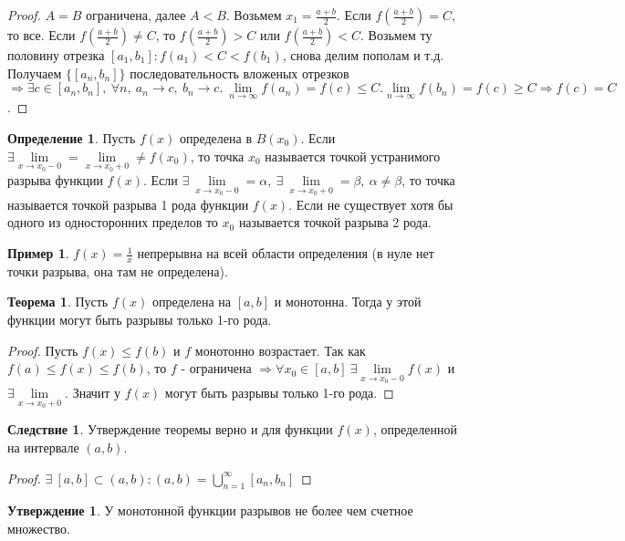 \documentclass[a4paper, 12pt]{article}
\newcommand{\lims}{\lim\limits_{n\to \infty}}
\theoremstyle{definition}
\newtheorem*{definition}{Определение}
\newtheorem*{theorem}{Теорема}
\newtheorem*{consequense}{Следствие}
\newtheorem*{statement}{Утверждение}
\newtheorem*{example}{Пример}
\begin{document}
        \begin{proof}
            $A=B$ ограничена, далее $A<B$. Возьмем $x_1=\frac{a+b}{2}$. Если $f(\frac{a+b}{2})=C$, то все. Если $f(\frac{a+b}{2})\ne C$, то $f(\frac{a+b}{2})>C$ или $f(\frac{a+b}{2})<C$. Возьмем ту половину отрезка $[a_1,b_1]: f(a_1)<C<f(b_1)$, снова делим пополам и т.д. Получаем $\{[a_n,b_n]\}$ последовательность вложеных отрезков $\Rightarrow \exists c\in [a_n,b_n],\ \forall n,\ a_n\to c,\ b_n\to c.\ \lims f(a_n)=f(c)\leq C. \lims f(b_n)=f(c)\geq C \Rightarrow f(c)=C$. 
        \end{proof} 
        \begin{definition}
            Пусть $f(x)$ определена в $B(x_0)$. Если $\exists \lim\limits_{x\to x_0-0}=\lim\limits_{x\to x_0+0}\ne f(x_0)$, то  точка $x_0$ называется точкой устранимого разрыва функции $f(x)$. Если $\exists\ \lim\limits_{x\to x_0-0}=\alpha,\ \exists\ \lim\limits_{x\to x_0+0}=\beta,\ \alpha\ne \beta$, то точка называется точкой разрыва 1 рода функции $f(x)$. Если не существует хотя бы одного из односторонних пределов то $x_0$ называется точкой разрыва 2 рода. 
        \end{definition} 
        \begin{example}
            $f(x)=\frac{1}{x}$ непрерывна на всей области определения (в нуле нет точки разрыва, она там не определена).
        \end{example}
        \begin{theorem}
            Пусть $f(x)$ определена на $[a,b]$ и монотонна. Тогда у этой функции могут быть разрывы только 1-го рода.
        \end{theorem} 
        \begin{proof}
            Пусть $f(x)\leq f(b)$ и $f$ монотонно возрастает. Так как $f(a)\leq f(x)\leq f(b)$, то $f$ - ограничена $\Rightarrow \forall x_0\in [a,b]\ \exists \lim\limits_{x\to x_0-0}f(x)$ и $\exists \lim\limits_{x\to x_0+0}$. Значит у $f(x)$ могут быть разрывы только 1-го рода.
        \end{proof}
        \begin{consequense}
            Утверждение теоремы верно и для функции $f(x)$, определенной на интервале $(a,b)$.
        \end{consequense} 
        \begin{proof}
            $\exists\ [a,b]\subset (a,b): (a,b)=\bigcup\limits_{n=1}^{\infty}[a_n,b_n]$
        \end{proof}
        \begin{statement}
            У монотонной функции разрывов не более чем счетное множество.
        \end{statement} 
\end{document}

